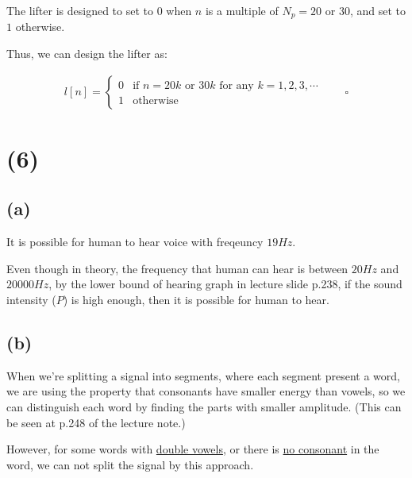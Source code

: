 \documentclass{article}
\begin{document}


The lifter is designed to set to $0$ when $n$ is a multiple of $N_p = 20$ or $30$, 
and set to $1$ otherwise.
\bigskip

Thus, we can design the lifter as:

\begin{align*}
    l[n] = \begin{cases}
        0 & \text{if } n = 20k \text{ or } 30k \text{ for any } k = 1, 2, 3, \cdots \\
        1 & \text{otherwise}
    \end{cases} \qquad \square
\end{align*}


\section*{(6)}

\subsection*{(a)}

It is possible for human to hear voice with freqeuncy $19Hz$.
\bigskip

Even though in theory, the frequency that human can hear is between $20Hz$ and $20000Hz$,
by the lower bound of hearing graph in lecture slide p.238, if the sound intensity ($P$) is high enough,
then it is possible for human to hear.

\subsection*{(b)}

When we're splitting a signal into segments, where each segment present a word, 
we are using the property that consonants have smaller energy than vowels, 
so we can distinguish each word by finding the parts with smaller amplitude.
(This can be seen at p.248 of the lecture note.)
\bigskip

However, for some words with \underline{double vowels}, or there is \underline{no consonant} in the word, 
we can not split the signal by this approach.
\end{document}
